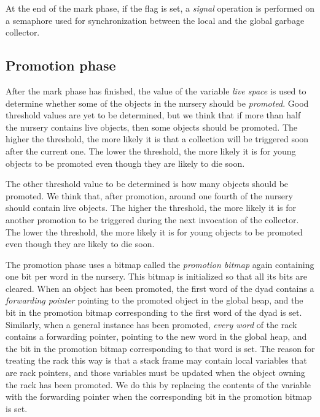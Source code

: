 At the end of the mark phase, if the flag is set, a \emph{signal}
operation is performed on a semaphore used for synchronization between
the local and the global garbage collector.

\subsection{Promotion phase}

After the mark phase has finished, the value of the variable
\emph{live space} is used to determine whether some of the
objects in the nursery should be \emph{promoted}.  Good threshold
values are yet to be determined, but we think that if more than half
the nursery contains live objects, then some objects should be
promoted.  The higher the threshold, the more likely it is that a
collection will be triggered soon after the current one.  The lower
the threshold, the more likely it is for young objects to be promoted
even though they are likely to die soon.

The other threshold value to be determined is how many objects should
be promoted.  We think that, after promotion, around one fourth of the
nursery should contain live objects.  The higher the threshold, the
more likely it is for another promotion to be triggered during the
next invocation of the collector.  The lower the threshold, the more
likely it is for young objects to be promoted even though they are
likely to die soon.

The promotion phase uses a bitmap called the \emph{promotion bitmap}
again containing one bit per word in the nursery.  This bitmap is
initialized so that all its bits are cleared.  When an object has been
promoted, the first word of the dyad contains a \emph{forwarding
  pointer} pointing to the promoted object in the global heap, and the
bit in the promotion bitmap corresponding to the first word of the
dyad is set.  Similarly, when a general instance has been promoted,
\emph{every word} of the rack contains a forwarding pointer, pointing
to the new word in the global heap, and the bit in the promotion
bitmap corresponding to that word is set.  The reason for treating the
rack this way is that a stack frame may contain local variables that
are rack pointers, and those variables must be updated when the object
owning the rack has been promoted.  We do this by replacing the
contents of the variable with the forwarding pointer when the
corresponding bit in the promotion bitmap is set.

